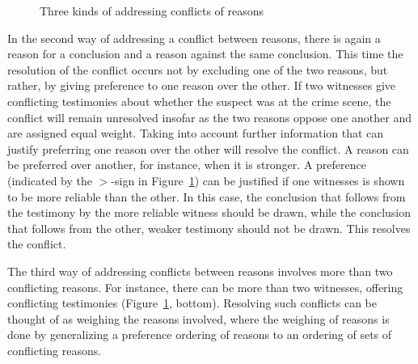 \documentclass[10pt]{article}
\begin{document}

\begin{figure}[bt]
\centering

\caption{Three kinds of addressing conflicts of reasons\label{fig:conflicts}}
\end{figure}

In the second way of addressing a conflict between reasons, there is again a reason for a conclusion 
and a reason against the same conclusion. This time the resolution of the conflict
occurs not by excluding one of the two reasons, but rather, by giving preference to one reason over the other.
If two witnesses give conflicting testimonies about whether the suspect was at the crime scene, 
the conflict will remain unresolved insofar as the 
two reasons oppose one another and are assigned equal weight. %
Taking into account further information that can justify preferring one 
reason over the other will resolve the conflict. A reason can be preferred over another, for instance, when it is stronger. 
A preference (indicated by the $>$-sign in Figure~\ref{fig:conflicts}) 
can be justified if one witnesses is shown to be more reliable than the other. In this case, the conclusion that 
follows from the testimony by the more reliable witness should be drawn, while the conclusion that follows from the other, weaker 
testimony should not be drawn. This resolves the conflict. 

The third way of addressing conflicts between reasons involves 
more than two conflicting reasons. For instance, there can be more 
than two witnesses, offering conflicting testimonies (Figure~\ref{fig:conflicts}, bottom). %
Resolving such conflicts can be thought of as 
weighing the reasons involved, where the weighing of reasons 
is done by generalizing a preference ordering of reasons to an ordering of sets of conflicting reasons. 

\end{document}
